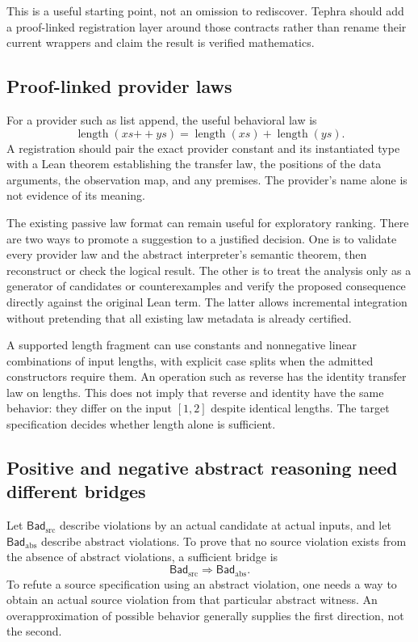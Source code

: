 \documentclass[11pt,a4paper]{article}
\theoremstyle{plain}
\theoremstyle{definition}
\begin{document}
This is a useful starting point, not an omission to rediscover. Tephra should add a proof-linked registration layer around those contracts rather than rename their current wrappers and claim the result is verified mathematics.

\subsection{Proof-linked provider laws}
For a provider such as list append, the useful behavioral law is
\[
 \operatorname{length}(xs\mathbin{+\!+}ys)
  =\operatorname{length}(xs)+\operatorname{length}(ys).
\]
A registration should pair the exact provider constant and its instantiated type with a Lean theorem establishing the transfer law, the positions of the data arguments, the observation map, and any premises. The provider's name alone is not evidence of its meaning.

The existing passive law format can remain useful for exploratory ranking. There are two ways to promote a suggestion to a justified decision. One is to validate every provider law and the abstract interpreter's semantic theorem, then reconstruct or check the logical result. The other is to treat the analysis only as a generator of candidates or counterexamples and verify the proposed consequence directly against the original Lean term. The latter allows incremental integration without pretending that all existing law metadata is already certified.

A supported length fragment can use constants and nonnegative linear combinations of input lengths, with explicit case splits when the admitted constructors require them. An operation such as reverse has the identity transfer law on lengths. This does not imply that reverse and identity have the same behavior: they differ on the input $[1,2]$ despite identical lengths. The target specification decides whether length alone is sufficient.

\subsection{Positive and negative abstract reasoning need different bridges}
Let $\mathsf{Bad}_{\mathrm{src}}$ describe violations by an actual candidate at actual inputs, and let $\mathsf{Bad}_{\mathrm{abs}}$ describe abstract violations. To prove that no source violation exists from the absence of abstract violations, a sufficient bridge is
\[
 \mathsf{Bad}_{\mathrm{src}}\Longrightarrow\mathsf{Bad}_{\mathrm{abs}}.
\]
To refute a source specification using an abstract violation, one needs a way to obtain an actual source violation from that particular abstract witness. An overapproximation of possible behavior generally supplies the first direction, not the second.
\end{document}
